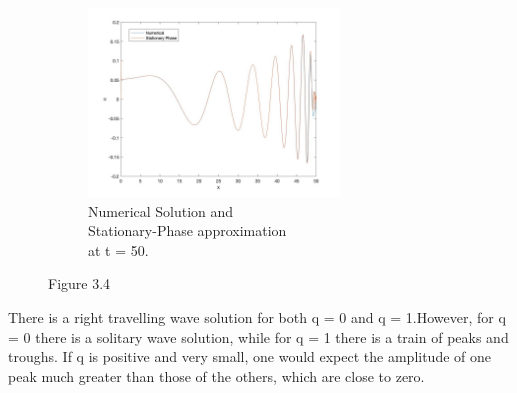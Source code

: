 \documentclass[a4paper,11pt]{article}
\begin{document}
\begin{figure}[H]
\begin{subfigure}{0.5\textwidth}
 \label{Q3(c)}
 \end{subfigure}
 \begin{subfigure}{0.5\textwidth}
 \includegraphics[width = \linewidth, height =5cm]{Q3(3).jpg}
 \caption{Numerical Solution and \\Stationary-Phase approximation \\ at t = 50.}
 \label{Q3(3)}
 \end{subfigure} 
 \caption{Figure 3.4}
\end{figure}
There is a right travelling wave solution for both q = 0 and q = 1.However, for q = 0 there is a solitary wave solution, while for q = 1 there is a train of peaks and troughs. If q is positive and very small, one would expect the amplitude of one peak much greater than those of the others, which are close to zero.
\end{document}
